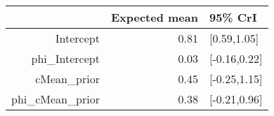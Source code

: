 \begin{tabular}{rrl}
  \hline
 & Expected mean & 95\% CrI \\ 
  \hline
Intercept & 0.81 & [0.59,1.05] \\ 
  phi\_Intercept & 0.03 & [-0.16,0.22] \\ 
  cMean\_prior & 0.45 & [-0.25,1.15] \\ 
  phi\_cMean\_prior & 0.38 & [-0.21,0.96] \\ 
   \hline
\end{tabular}

